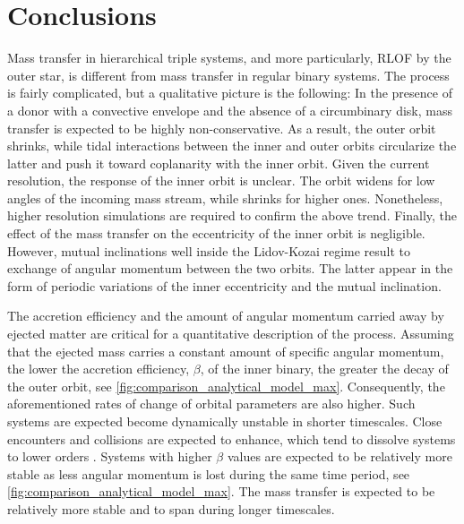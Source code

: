 \section{Conclusions}

Mass transfer in hierarchical triple systems, and more particularly, RLOF by the outer star, is different from mass transfer in regular binary systems. The process is fairly complicated, but a qualitative picture is the following: In the presence of a donor with a convective envelope and the absence of a circumbinary disk, mass transfer is expected to be highly non-conservative. As a result, the outer orbit shrinks, while tidal interactions between the inner and outer orbits circularize the latter and push it toward coplanarity with the inner orbit. Given the current resolution, the response of the inner orbit is unclear. The orbit widens for low angles of the incoming mass stream, while shrinks for higher ones. Nonetheless, higher resolution simulations are required to confirm the above trend. Finally, the effect of the mass transfer on the eccentricity of the inner orbit is negligible. However, mutual inclinations well inside the Lidov-Kozai regime result to exchange of angular momentum between the two orbits. The latter appear in the form of periodic variations of the inner eccentricity and the mutual inclination.

The accretion efficiency and the amount of angular momentum carried away by ejected matter are critical for a quantitative description of the process. Assuming that the ejected mass carries a constant amount of specific angular momentum, the lower the accretion efficiency, $\beta$, of the inner binary, the greater the decay of the outer orbit, see \cref{fig:comparison_analytical_model_max}. Consequently, the aforementioned rates of change of orbital parameters are also higher. Such systems are expected become dynamically unstable in shorter timescales. Close encounters and collisions are expected to enhance, which tend to dissolve systems to lower orders \citep{van2007formation}. Systems with higher $\beta$ values are expected to be relatively more stable as less angular momentum is lost during the same time period, see \cref{fig:comparison_analytical_model_max}. The mass transfer is expected to be relatively more stable and to span during longer timescales.

